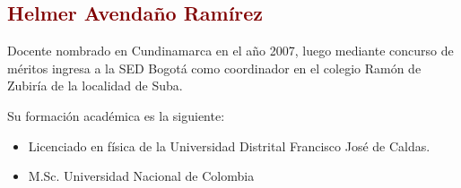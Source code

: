 \documentclass[10pt, notumble, letterpaper]{leaflet}
\begin{document}
\subsection{\textcolor{Maroon}{Helmer Avendaño Ramírez}}
Docente nombrado en Cundinamarca en el año 2007, luego mediante concurso de méritos ingresa a la SED Bogotá como coordinador en el colegio Ramón de Zubiría de la localidad de Suba.

Su formación académica es la siguiente:
\begin{itemize}
\item Licenciado en física de la Universidad Distrital Francisco José de Caldas.
\item M.Sc. Universidad Nacional de Colombia
\end{itemize}

\newpage




\newpage



\newpage



\end{document}
